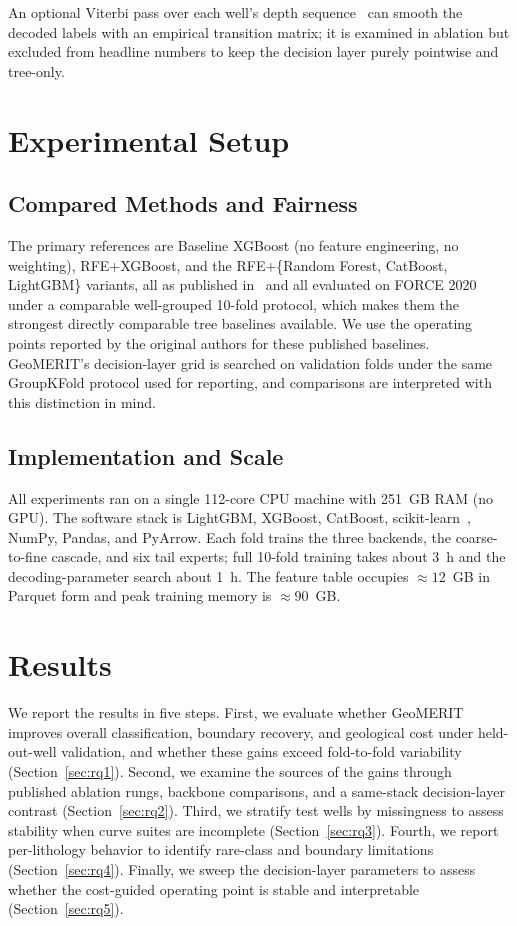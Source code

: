 \documentclass[bdcc,article,submit,pdftex,moreauthors]{Definitions/mdpi}
\begin{document}
An optional Viterbi pass over each well's depth sequence~\cite{viterbi1967,lafferty2001crf,sarawagi2004semimarkov}
can smooth the decoded labels with an empirical transition matrix; it is examined in
ablation but excluded from headline numbers to keep the decision layer purely pointwise and
tree-only.

\section{Experimental Setup}
\label{sec:setup}

\subsection{Compared Methods and Fairness}
\label{sec:compared}
The primary references are Baseline XGBoost (no feature engineering, no weighting),
RFE+XGBoost, and the RFE+\{Random Forest, CatBoost, LightGBM\} variants, all as published
in~\cite{chen2026rfe} and all evaluated on FORCE 2020 under a comparable well-grouped 10-fold
protocol, which makes them the strongest directly comparable tree baselines available. We use
the operating points reported by the original authors for these published baselines. GeoMERIT's
decision-layer grid is searched on validation folds under the same GroupKFold protocol used for
reporting, and comparisons are interpreted with this distinction in mind.

\subsection{Implementation and Scale}
\label{sec:impl}
All experiments ran on a single 112-core CPU machine with 251~GB RAM (no GPU). The software
stack is LightGBM, XGBoost, CatBoost, scikit-learn~\cite{pedregosa2011sklearn}, NumPy,
Pandas, and PyArrow. Each fold trains the three backends, the coarse-to-fine cascade, and six
tail experts; full 10-fold training takes about 3~h and the decoding-parameter search about
1~h. The feature table occupies $\approx\!12$~GB in Parquet form and peak training memory is
$\approx\!90$~GB.

\section{Results}
\label{sec:results}
We report the results in five steps. First, we evaluate whether GeoMERIT improves overall
classification, boundary recovery, and geological cost under held-out-well validation, and
whether these gains exceed fold-to-fold variability (Section~\ref{sec:rq1}). Second, we
examine the sources of the gains through published ablation rungs, backbone comparisons, and a
same-stack decision-layer contrast (Section~\ref{sec:rq2}). Third, we stratify test wells by
missingness to assess stability when curve suites are incomplete (Section~\ref{sec:rq3}).
Fourth, we report per-lithology behavior to identify rare-class and boundary limitations
(Section~\ref{sec:rq4}). Finally, we sweep the decision-layer parameters to assess whether the
cost-guided operating point is stable and interpretable (Section~\ref{sec:rq5}).
\end{document}
